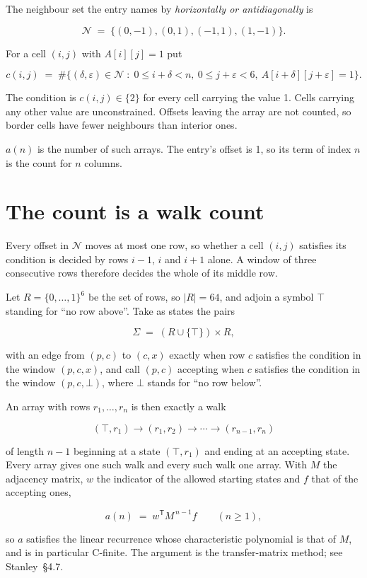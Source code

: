 \documentclass[11pt]{article}
\theoremstyle{definition}
\begin{document}
The neighbour set the entry names by {\itshape horizontally or antidiagonally} is

\[\mathcal{N} \;=\; \{(0,-1), (0,1), (-1,1), (1,-1)\}.\]

For a cell $(i,j)$ with $A[i][j] = 1$ put

\[c(i,j) \;=\; \#\bigl\{(\delta,\varepsilon)\in\mathcal{N} \;:\; 0\le i+\delta<n,\ 0\le j+\varepsilon<6,\ A[i+\delta][j+\varepsilon] = 1\bigr\}.\]

The condition is $c(i,j) \in \{2\}$ for every cell carrying the value 1. Cells carrying any other value are unconstrained. Offsets leaving the array are not counted, so border cells have fewer neighbours than interior ones.

$a(n)$ is the number of such arrays. The entry's offset is 1, so its term of index $n$ is the count for $n$ columns.

\section{The count is a walk count}

Every offset in $\mathcal{N}$ moves at most one row, so whether a cell $(i,j)$ satisfies its condition is decided by rows $i-1$, $i$ and $i+1$ alone. A window of three consecutive rows therefore decides the whole of its middle row.

Let $R = \{0,\dots,1\}^{6}$ be the set of rows, so $|R| = 64$, and adjoin a symbol $\top$ standing for ``no row above''. Take as states the pairs

\[\Sigma \;=\; (R \cup \{\top\}) \times R,\]

with an edge from $(p,c)$ to $(c,x)$ exactly when row $c$ satisfies the condition in the window $(p,c,x)$, and call $(p,c)$ accepting when $c$ satisfies the condition in the window $(p,c,\bot)$, where $\bot$ stands for ``no row below''.

An array with rows $r_1,\dots,r_n$ is then exactly a walk

\[(\top,r_1) \to (r_1,r_2) \to \cdots \to (r_{n-1},r_n)\]

of length $n-1$ beginning at a state $(\top,r_1)$ and ending at an accepting state. Every array gives one such walk and every such walk one array. With $M$ the adjacency matrix, $w$ the indicator of the allowed starting states and $f$ that of the accepting ones,

\[a(n) \;=\; w^{\mathsf T} M^{\,n-1} f \qquad (n \ge 1),\]

so $a$ satisfies the linear recurrence whose characteristic polynomial is that of $M$, and is in particular C-finite. The argument is the transfer-matrix method; see Stanley~\S4.7.
\end{document}
